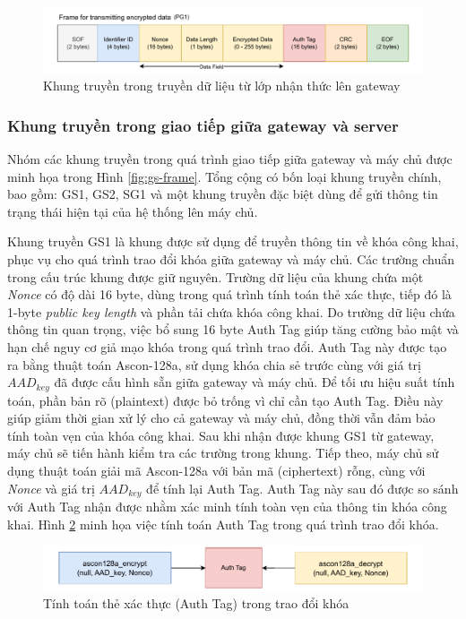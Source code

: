 \begin{figure}[H]
    \centering
    \includegraphics[width=0.9\linewidth]{pg-frame.pdf}
    \caption{Khung truyền trong truyền dữ liệu từ lớp nhận thức lên gateway}
    \label{fig:pg-frame}
\end{figure}

\subsubsection{Khung truyền trong giao tiếp giữa gateway và server}
\label{sec:gs}
Nhóm các khung truyền trong quá trình giao tiếp giữa gateway và máy chủ được minh họa trong Hình \ref{fig:gs-frame}. Tổng cộng có bốn loại khung truyền chính, bao gồm: GS1, GS2, SG1 và một khung truyền đặc biệt dùng để gửi thông tin trạng thái hiện tại của hệ thống lên máy chủ.

Khung truyền GS1 là khung được sử dụng để truyền thông tin về khóa công khai, phục vụ cho quá trình trao đổi khóa giữa gateway và máy chủ. Các trường chuẩn trong cấu trúc khung được giữ nguyên. Trường dữ liệu của khung chứa một \textit{Nonce} có độ dài 16 byte, dùng trong quá trình tính toán thẻ xác thực, tiếp đó là 1-byte \textit{public key length} và phần tải chứa khóa công khai. Do trường dữ liệu chứa thông tin quan trọng, việc bổ sung 16 byte Auth Tag giúp tăng cường bảo mật và hạn chế nguy cơ giả mạo khóa trong quá trình trao đổi. Auth Tag này được tạo ra bằng thuật toán Ascon-128a, sử dụng khóa chia sẻ trước cùng với giá trị $AAD_{key}$ đã được cấu hình sẵn giữa gateway và máy chủ. Để tối ưu hiệu suất tính toán, phần bản rõ (plaintext) được bỏ trống vì chỉ cần tạo Auth Tag. Điều này giúp giảm thời gian xử lý cho cả gateway và máy chủ, đồng thời vẫn đảm bảo tính toàn vẹn của khóa công khai. Sau khi nhận được khung GS1 từ gateway, máy chủ sẽ tiến hành kiểm tra các trường trong khung. Tiếp theo, máy chủ sử dụng thuật toán giải mã Ascon-128a với bản mã (ciphertext) rỗng, cùng với \textit{Nonce} và giá trị $AAD_{key}$ để tính lại Auth Tag. Auth Tag này sau đó được so sánh với Auth Tag nhận được nhằm xác minh tính toàn vẹn của thông tin khóa công khai. Hình \ref{fig:auth_t} minh họa việc tính toán Auth Tag trong quá trình trao đổi khóa.

\begin{figure}[h]
    \centering
    \includegraphics[width=0.85\linewidth]{auth_t.pdf}
    \caption{Tính toán thẻ xác thực (Auth Tag) trong trao đổi khóa}
    \label{fig:auth_t}
\end{figure}

